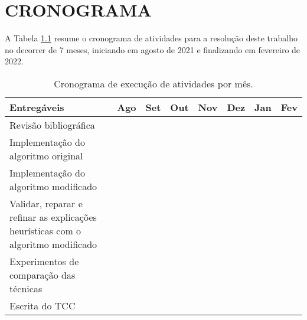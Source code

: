 \chapter{CRONOGRAMA}
A Tabela \ref{tab:cronograma} resume o cronograma de atividades para a resolução deste trabalho no decorrer de 7 meses, iniciando em agosto de 2021 e finalizando em fevereiro de 2022.

\begin{table}[H]
	\begin{center}
		\begin{tabular}{|p{7cm}|c|c|c|c|c|c|c|}
			\hline
			\textbf{Entregáveis} & \textbf{Ago} & \textbf{Set}& \textbf{Out}& \textbf{Nov}& \textbf{Dez}& \textbf{Jan}& \textbf{Fev}\\\hline
			Revisão bibliográfica & \cellcolor{gray!50} & \cellcolor{gray!50} &  &  &  &  & \\\hline
			Implementação do algoritmo original &  & \cellcolor{gray!50} & \cellcolor{gray!50} &  &  &  & \\\hline
			Implementação do algoritmo modificado &  &  & \cellcolor{gray!50} & \cellcolor{gray!50} &  &  & \\\hline
			Validar, reparar e refinar as explicações heurísticas com o algoritmo modificado &  &  &  & \cellcolor{gray!50} & \cellcolor{gray!50} &  & \\\hline
			Experimentos de comparação das técnicas &  &  &  &  & \cellcolor{gray!50} & \cellcolor{gray!50} & \\\hline
			Escrita do TCC &  &  &  &  &  & \cellcolor{gray!50} & \cellcolor{gray!50}\\\hline
			
		\end{tabular}
		\caption{Cronograma de execução de atividades por mês.}
		\label{tab:cronograma}
	\end{center}
\end{table}